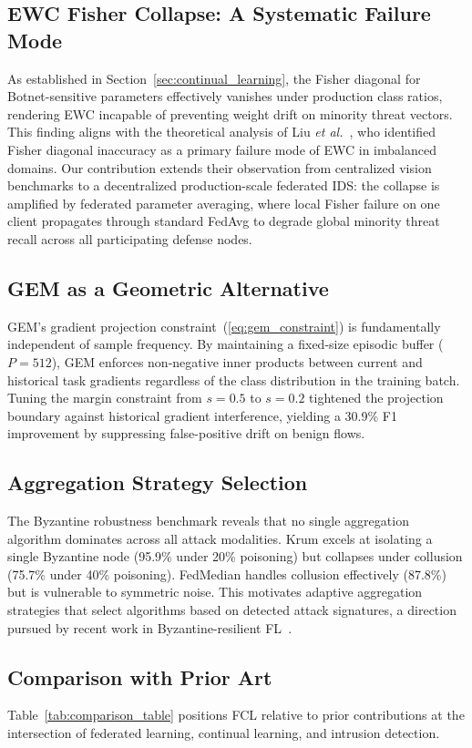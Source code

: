 \documentclass[journal,10pt,twocolumn]{IEEEtran}
\begin{document}
\subsection{EWC Fisher Collapse: A Systematic Failure Mode}
As established in Section~\ref{sec:continual_learning}, the Fisher diagonal for Botnet-sensitive parameters effectively vanishes under production class ratios, rendering EWC incapable of preventing weight drift on minority threat vectors. This finding aligns with the theoretical analysis of Liu \emph{et al.}~\cite{liu2026ewc}, who identified Fisher diagonal inaccuracy as a primary failure mode of EWC in imbalanced domains. Our contribution extends their observation from centralized vision benchmarks to a decentralized production-scale federated IDS: the collapse is amplified by federated parameter averaging, where local Fisher failure on one client propagates through standard FedAvg to degrade global minority threat recall across all participating defense nodes.

\subsection{GEM as a Geometric Alternative}
GEM's gradient projection constraint~(\ref{eq:gem_constraint}) is fundamentally independent of sample frequency. By maintaining a fixed-size episodic buffer ($P=512$), GEM enforces non-negative inner products between current and historical task gradients regardless of the class distribution in the training batch. Tuning the margin constraint from $s=0.5$ to $s=0.2$ tightened the projection boundary against historical gradient interference, yielding a 30.9\% F1 improvement by suppressing false-positive drift on benign flows.

\subsection{Aggregation Strategy Selection}
The Byzantine robustness benchmark reveals that no single aggregation algorithm dominates across all attack modalities. Krum excels at isolating a single Byzantine node (95.9\% under 20\% poisoning) but collapses under collusion (75.7\% under 40\% poisoning). FedMedian handles collusion effectively (87.8\%) but is vulnerable to symmetric noise. This motivates adaptive aggregation strategies that select algorithms based on detected attack signatures, a direction pursued by recent work in Byzantine-resilient FL~\cite{yin2018byzantine}.

\subsection{Comparison with Prior Art}
Table~\ref{tab:comparison_table} positions FCL relative to prior contributions at the intersection of federated learning, continual learning, and intrusion detection.
\end{document}
